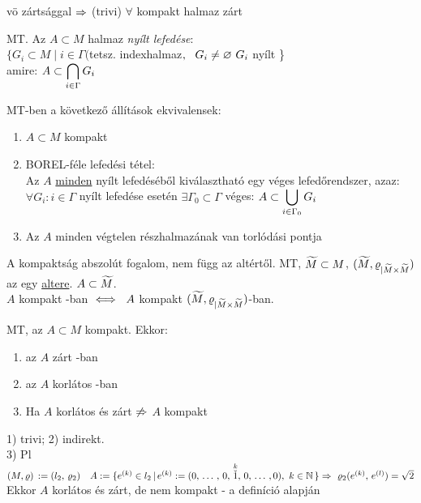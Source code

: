 \begin{megj}
  vö zártsággal $\Rightarrow$ (trivi) $\forall$ kompakt halmaz zárt
\end{megj}

\begin{de}\MT MT. Az $A\subset M$ halmaz \emph{nyílt lefedése}:\\
  $\{G_i\subset M \mid  i\in \Gamma ($tetsz. indexhalmaz$,\ \ G_i
  \neq \varnothing\ G_i$ nyílt \}\\
  amire: $\displaystyle A\subset \bigcap_{i\in\Gamma}G_i$
\end{de}

\newpage %
\begin{te}\MT MT-ben a
  következő állítások ekvivalensek:
  \begin{enumerate}
  \item $A\subset M$ kompakt
  \item BOREL-féle lefedési tétel:\\
    Az $A$ \underline{minden} nyílt lefedéséből kiválasztható
    egy véges lefedőrendszer, azaz: $\forall{G_i : i\in \Gamma}$
    nyílt lefedése esetén $\exists \Gamma_0\subset\Gamma$ véges:
    $\displaystyle A\subset\bigcup_{i\in\Gamma_0}G_i$
  \item Az $A$ minden  végtelen részhalmazának van torlódási pontja
  \end{enumerate}
\end{te}

\begin{megj}
  A kompaktság abszolút fogalom, nem függ az altértől. \MT MT,
  $\widetilde{M}\subset M$,
  $(\widetilde{M},\varrho_{|\widetilde{M}\times\widetilde{M}})$ az \MT egy
  \underline{altere}. $A\subset \widetilde{M}$.\\
  $A$ kompakt \MT-ban $\iff\ A$ kompakt
  $(\widetilde{M},\varrho_{|\widetilde{M}\times\widetilde{M}})$-ban.
\end{megj}

\begin{te} \MT MT, az $A\subset M$
  kompakt. Ekkor:
  \begin{enumerate}
  \item az $A$ zárt \MT-ban
  \item az $A$ korlátos \MT-ban
  \item Ha $A$ korlátos és zárt  $\not\Rightarrow$ $A$ kompakt
  \end{enumerate}    
\end{te}
\begin{biz}
  1) trivi; 2) indirekt.\\
  3) Pl $(M,\varrho)\, := (l_2,\,\varrho_2)\quad A := \{ e^{(k)} \in l_2\, |\, e^{(k)} :=
  (0,\,\ldots\,,\,0,\, \overset{k}{\check{1}},\,0,\,\ldots\,,0),\
  k\in \mathbb{N}\,\}\\\Rightarrow\ \varrho_2(e^{(k)},\, e^{(l)}) = \sqrt2$\quad Ekkor $A$
  korlátos és zárt, de nem kompakt - a definíció alapján
\end{biz}

